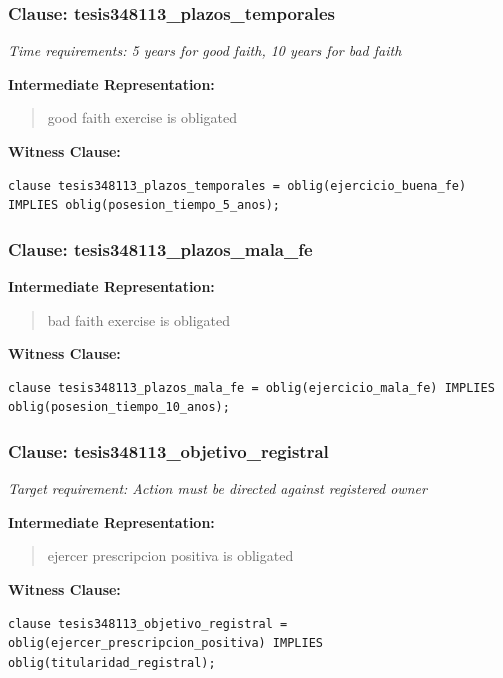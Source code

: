 \documentclass[11pt,a4paper]{article}
\begin{document}
\subsubsection{Clause: tesis348113\_plazos\_temporales}

\textit{Time requirements: 5 years for good faith, 10 years for bad faith}

\textbf{Intermediate Representation:}

\begin{quote}
good faith exercise is obligated
\end{quote}

\textbf{Witness Clause:}

\begin{lstlisting}[style=witnessstyle, language=Witness]
clause tesis348113_plazos_temporales = oblig(ejercicio_buena_fe) IMPLIES oblig(posesion_tiempo_5_anos);
\end{lstlisting}

\subsubsection{Clause: tesis348113\_plazos\_mala\_fe}

\textbf{Intermediate Representation:}

\begin{quote}
bad faith exercise is obligated
\end{quote}

\textbf{Witness Clause:}

\begin{lstlisting}[style=witnessstyle, language=Witness]
clause tesis348113_plazos_mala_fe = oblig(ejercicio_mala_fe) IMPLIES oblig(posesion_tiempo_10_anos);
\end{lstlisting}

\subsubsection{Clause: tesis348113\_objetivo\_registral}

\textit{Target requirement: Action must be directed against registered owner}

\textbf{Intermediate Representation:}

\begin{quote}
ejercer prescripcion positiva is obligated
\end{quote}

\textbf{Witness Clause:}

\begin{lstlisting}[style=witnessstyle, language=Witness]
clause tesis348113_objetivo_registral = oblig(ejercer_prescripcion_positiva) IMPLIES oblig(titularidad_registral);
\end{lstlisting}
\end{document}
